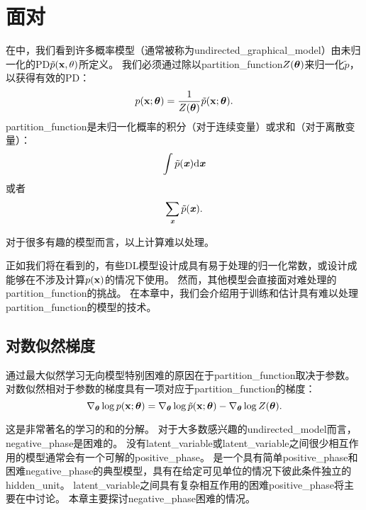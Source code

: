 \chapter{面对}
\label{chap:confronting_the_partition_function}
在中，我们看到许多概率模型（通常被称为\gls{undirected_graphical_model}）由未归一化的\gls{PD}$\tilde{p}(\mathbf{x}, \theta)$所定义。
我们必须通过除以\gls{partition_function}$Z(\boldsymbol{\theta})$来归一化$\tilde{p}$，以获得有效的\gls{PD}：
\begin{equation}
	p(\mathbf{x}; \boldsymbol{\theta}) = \frac{1}{Z(\boldsymbol{\theta})} \tilde{p}(\mathbf{x}; \boldsymbol{\theta}).
\end{equation}
\gls{partition_function}是未归一化概率的积分（对于连续变量）或求和（对于离散变量）：
\begin{equation}
	\int \tilde{p}(\boldsymbol{\mathit{x}}) \mathrm{d} \boldsymbol{\mathit{x}}
\end{equation}
或者
\begin{equation}
	\sum_{\boldsymbol{\mathit{x}}} \tilde{p} (\boldsymbol{\mathit{x}}).
\end{equation}


对于很多有趣的模型而言，以上计算难以处理。


正如我们将在看到的，有些\gls{DL}模型设计成具有易于处理的归一化常数，或设计成能够在不涉及计算$p(\mathbf{x})$的情况下使用。
然而，其他模型会直接面对难处理的\gls{partition_function}的挑战。
在本章中，我们会介绍用于训练和估计具有难以处理\gls{partition_function}的模型的技术。


\section{对数似然梯度}
\label{sec:the_log_likelihood_gradient}
通过最大似然学习无向模型特别困难的原因在于\gls{partition_function}取决于参数。
对数似然相对于参数的梯度具有一项对应于\gls{partition_function}的梯度：
\begin{equation}
	\nabla_{\boldsymbol{\theta}} \log p(\mathbf{x}; \boldsymbol{\theta}) = \nabla_{\boldsymbol{\theta}} \log \tilde{p}(\mathbf{x}; \boldsymbol{\theta}) -
\nabla_{\boldsymbol{\theta}} \log Z(\boldsymbol{\theta}).
\end{equation}


这是非常著名的学习的和的分解。
对于大多数感兴趣的\gls{undirected_model}而言，\gls{negative_phase}是困难的。
没有\gls{latent_variable}或\gls{latent_variable}之间很少相互作用的模型通常会有一个可解的\gls{positive_phase}。
是一个具有简单\gls{positive_phase}和困难\gls{negative_phase}的典型模型，具有在给定可见单位的情况下彼此条件独立的\gls{hidden_unit}。
\gls{latent_variable}之间具有复杂相互作用的困难\gls{positive_phase}将主要在中讨论。
本章主要探讨\gls{negative_phase}困难的情况。



